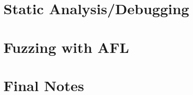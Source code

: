 \documentclass[12pt, letterpaper]{article}
\begin{document}
\begin{sloppypar}
\begin{flushleft}
\section*{Static Analysis/Debugging}


\section*{Fuzzing with AFL}


\section*{Final Notes}

\end{flushleft}
\end{sloppypar}
\end{document}

